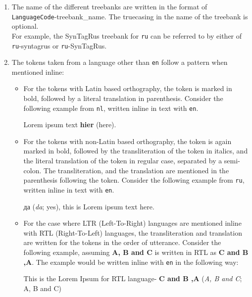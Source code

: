 \begin{enumerate}
    \item The name of the different treebanks are written in the format of\\ \verb|LanguageCode|-treebank\_name. The truecasing in the name of the treebank is optional.\\
    For example, the SynTagRus treebank for \verb|ru| can be referred to by either of \verb|ru|-syntagrus or \verb|ru|-SynTagRus.
    
    \item The tokens taken from a language other than \verb|en| follow a pattern when mentioned inline:
    \begin{itemize}
        \item For the tokens with Latin based orthography, the token is marked in bold, followed by a literal translation in parenthesis. Consider the following example from \verb|nl|, written inline in text with \verb|en|.
        \begin{example}
            Lorem ipsum text \textbf{hier} (here).
        \end{example}
        \item For the tokens with non-Latin based orthography, the token is again marked in bold, followed by the transliteration of the token in italics, and the literal translation of the token in regular case, separated by a semi-colon. The transliteration, and the translation are mentioned in the parenthesis following the token. Consider the following example from \verb|ru|, written inline in text with \verb|en|.
        \begin{example}
            \textrussian{да} (\textit{da}; yes), this is Lorem ipsum text here.
        \end{example}
        \item For the case where LTR (Left-To-Right) languages are mentioned inline with RTL (Right-To-Left) languages, the transliteration and translation are written for the tokens in the order of utterance. Consider the following example, assuming \textbf{A, B and C} is written in RTL as \textbf{C and B ,A}. The example would be written inline with \verb|en| in the following way:
        \begin{example}
            This is the Lorem Ipsum for RTL language- \textbf{C and B ,A} (\textit{A, B and C}; A, B and C)
        \end{example}
    \end{itemize}
    
\end{enumerate}